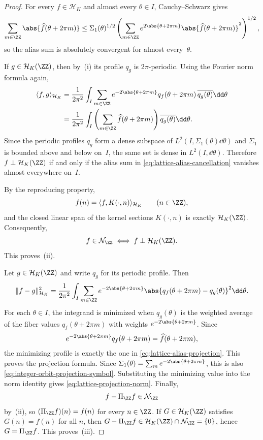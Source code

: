 \begin{proof}
For every $f\in\mathcal H_K$ and almost every $\theta\in I$,
Cauchy--Schwarz gives
\[
\sum_{m\in\ZZ}\abs{\widehat f(\theta+2\pi m)}
\le
\Sigma_1(\theta)^{1/2}
\left(
\sum_{m\in\ZZ}e^{2\abs{\theta+2\pi m}}
\abs{\widehat f(\theta+2\pi m)}^2
\right)^{1/2},
\]
so the alias sum is absolutely convergent for almost every~$\theta$.

If $g\in\mathcal H_K(\ZZ)$, then by~(i) its profile $q_g$ is
$2\pi$-periodic.  Using the Fourier norm formula again,
\begin{align*}
\langle f,g\rangle_{\mathcal H_K}
&=
\frac{1}{2\pi^2}\int_I
\sum_{m\in\ZZ}e^{-2\abs{\theta+2\pi m}}q_f(\theta+2\pi m)\,
\overline{q_g(\theta)}\dd\theta \\
&=
\frac{1}{2\pi^2}\int_I
\left(
\sum_{m\in\ZZ}\widehat f(\theta+2\pi m)
\right)\overline{q_g(\theta)}\dd\theta.
\end{align*}
Since the periodic profiles $q_g$ form a dense subspace of
$L^2(I,\Sigma_1(\theta)\dd\theta)$ and $\Sigma_1$ is bounded above and below
on~$I$, the same set is dense in $L^2(I,\dd\theta)$.  Therefore
$f\perp\mathcal H_K(\ZZ)$ if and only if the alias sum in
\eqref{eq:lattice-alias-cancellation} vanishes almost everywhere on~$I$.

By the reproducing property,
\[
f(n)=\langle f,K(\cdot,n)\rangle_{\mathcal H_K}
\qquad(n\in\ZZ),
\]
and the closed linear span of the kernel sections $K(\cdot,n)$ is
exactly $\mathcal H_K(\ZZ)$.  Consequently,
\[
f\in\mathcal N_{\ZZ}
\iff
f\perp\mathcal H_K(\ZZ).
\]
This proves~(ii).

Let $g\in\mathcal H_K(\ZZ)$ and write $q_g$ for its periodic profile.
Then
\[
\|f-g\|_{\mathcal H_K}^2
=\frac{1}{2\pi^2}\int_I
\sum_{m\in\ZZ}e^{-2\abs{\theta+2\pi m}}
\abs{q_f(\theta+2\pi m)-q_g(\theta)}^2\dd\theta.
\]
For each $\theta\in I$, the integrand is minimized when $q_g(\theta)$ is the
weighted average of the fiber values $q_f(\theta+2\pi m)$ with weights
$e^{-2\abs{\theta+2\pi m}}$.  Since
\[
e^{-2\abs{\theta+2\pi m}}q_f(\theta+2\pi m)
=\widehat f(\theta+2\pi m),
\]
the minimizing profile is exactly the one in
\eqref{eq:lattice-alias-projection}.  This proves the projection formula.
Since \(\Sigma_1(\theta)=\sum_m e^{-2\abs{\theta+2\pi m}}\), this is also
\eqref{eq:integer-orbit-projection-symbol}.
Substituting the minimizing value into the norm identity gives
\eqref{eq:lattice-projection-norm}.  Finally,
\[
f-\Pi_{\ZZ}f\in\mathcal N_{\ZZ}
\]
by~(ii), so $(\Pi_{\ZZ}f)(n)=f(n)$ for every $n\in\ZZ$.  If
$G\in\mathcal H_K(\ZZ)$ satisfies $G(n)=f(n)$ for all $n$, then
$G-\Pi_{\ZZ}f\in\mathcal H_K(\ZZ)\cap\mathcal N_{\ZZ}=\{0\}$, hence
$G=\Pi_{\ZZ}f$.  This proves~(iii).


\end{proof}
